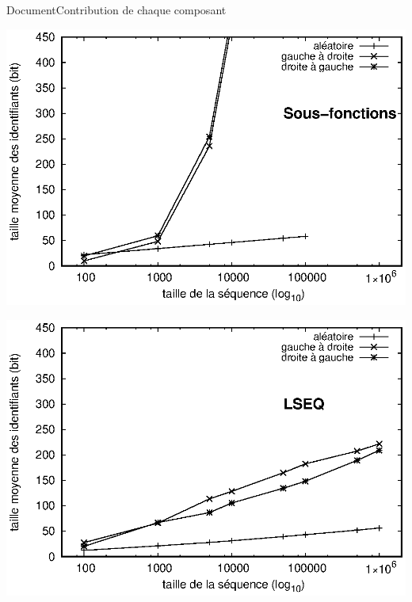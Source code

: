 \begin{frame}{Document}{Contribution de chaque composant}
  \hspace{-1cm}
  \begin{minipage}{0.45\textwidth}
      {\includegraphics[width=1.25\textwidth]{img/replication/robin.eps}}%
  \end{minipage}
  \hspace{1.5cm}
  \begin{minipage}{0.45\textwidth}
      {\includegraphics[width=1.25\textwidth]{img/replication/lseq.eps}}%
  \end{minipage}

\end{frame}


